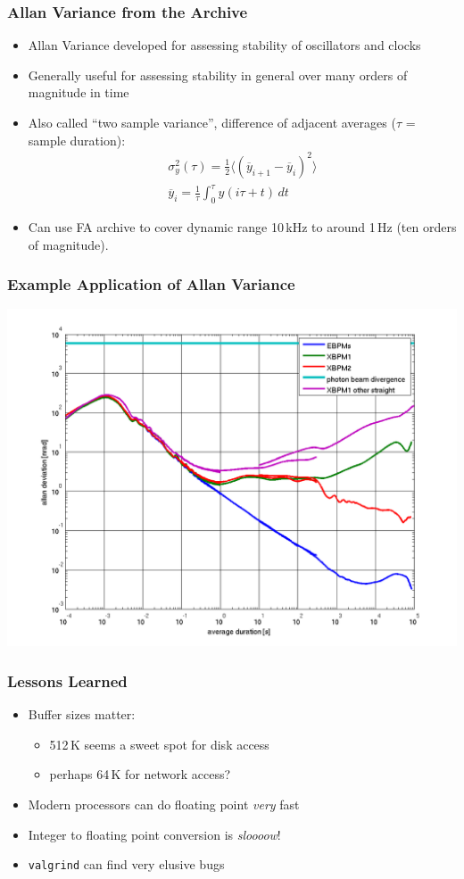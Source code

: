 \documentclass{beamer}
\begin{document}
\begin{frame}\frametitle{Allan Variance from the Archive}
\begin{itemize}
\item Allan Variance developed for assessing stability of oscillators and clocks
\item Generally useful for assessing stability in general over many orders of
magnitude in time
\item Also called ``two sample variance'', difference of adjacent averages
($\tau$ = sample duration):
\begin{gather*}
\sigma_y^2(\tau) =
    \frac12\langle(\overline{y}_{i+1} - \overline{y}_i)^2\rangle \\[1ex]
\overline{y}_i = \frac1\tau \int_0^\tau y(i\tau + t) \, dt
\end{gather*}
\item Can use FA archive to cover dynamic range 10\,kHz to around
1\,\textmu{}Hz (ten orders of magnitude).
\end{itemize}
\end{frame}


\begin{frame}\frametitle{Example Application of Allan Variance}
\includegraphics[width=\linewidth]{allan}
\end{frame}


\begin{frame}\frametitle{Lessons Learned}
\begin{itemize}
\item Buffer sizes matter:
    \begin{itemize}
    \item 512\,K seems a sweet spot for disk access
    \item perhaps 64\,K for network access?
    \end{itemize}
\item Modern processors can do floating point \emph{very} fast
\item Integer to floating point conversion is \emph{sloooow}!
\item \texttt{valgrind} can find very elusive bugs
\end{itemize}
\end{frame}
\end{document}
